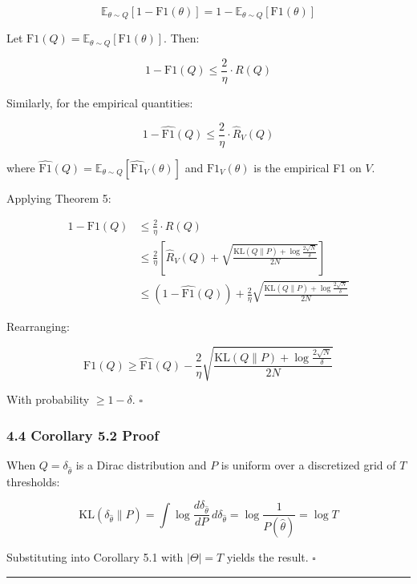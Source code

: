 \documentclass[
  12pt,
]{ctexart}
\begin{document}
\[\mathbb{E}_{\theta \sim Q}[1 - \text{F1}(\theta)] = 1 - \mathbb{E}_{\theta \sim Q}[\text{F1}(\theta)]\]

Let \(\text{F1}(Q) = \mathbb{E}_{\theta \sim Q}[\text{F1}(\theta)]\).
Then:

\[1 - \text{F1}(Q) \leq \frac{2}{\eta} \cdot R(Q)\]

Similarly, for the empirical quantities:

\[1 - \widehat{\text{F1}}(Q) \leq \frac{2}{\eta} \cdot \hat{R}_V(Q)\]

where
\(\widehat{\text{F1}}(Q) = \mathbb{E}_{\theta \sim Q}[\widehat{\text{F1}}_V(\theta)]\)
and \(\widehat{\text{F1}}_V(\theta)\) is the empirical F1 on \(V\).

Applying Theorem 5:

\[\begin{aligned}
1 - \text{F1}(Q) &\leq \frac{2}{\eta} \cdot R(Q) \\
&\leq \frac{2}{\eta} \left[ \hat{R}_V(Q) + \sqrt{\frac{\text{KL}(Q \parallel P) + \log\frac{2\sqrt{N}}{\delta}}{2N}} \right] \\
&\leq (1 - \widehat{\text{F1}}(Q)) + \frac{2}{\eta} \sqrt{\frac{\text{KL}(Q \parallel P) + \log\frac{2\sqrt{N}}{\delta}}{2N}}
\end{aligned}\]

Rearranging:

\[\text{F1}(Q) \geq \widehat{\text{F1}}(Q) - \frac{2}{\eta} \sqrt{\frac{\text{KL}(Q \parallel P) + \log\frac{2\sqrt{N}}{\delta}}{2N}}\]

With probability \(\geq 1-\delta\). \(\square\)

\subsubsection{4.4 Corollary 5.2 Proof}\label{corollary-5.2-proof}

When \(Q = \delta_{\hat{\theta}}\) is a Dirac distribution and \(P\) is
uniform over a discretized grid of \(T\) thresholds:

\[\text{KL}(\delta_{\hat{\theta}} \parallel P) = \int \log\frac{d\delta_{\hat{\theta}}}{dP}\, d\delta_{\hat{\theta}} = \log\frac{1}{P(\hat{\theta})} = \log T\]

Substituting into Corollary 5.1 with \(|\Theta| = T\) yields the result.
\(\square\)

\begin{center}\rule{0.5\linewidth}{0.5pt}\end{center}
\end{document}
